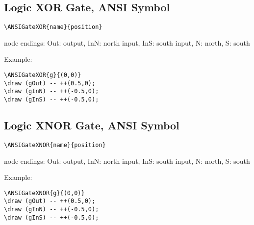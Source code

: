 \documentclass[parskip=full]{scrartcl}
\begin{document}
\subsection{Logic XOR Gate, ANSI Symbol}

\begin{verbatim}
\ANSIGateXOR{name}{position}
\end{verbatim}
node endings: Out: output,
              InN: north input, InS: south input,
              N: north, S: south

Example:\\
\begin{minipage}{0.8\textwidth}
\begin{verbatim}
\ANSIGateXOR{g}{(0,0)}
\draw (gOut) -- ++(0.5,0);
\draw (gInN) -- ++(-0.5,0);
\draw (gInS) -- ++(-0.5,0);
\end{verbatim}
\end{minipage}
\begin{minipage}{0.19\textwidth}
\end{minipage}

\subsection{Logic XNOR Gate, ANSI Symbol}

\begin{verbatim}
\ANSIGateXNOR{name}{position}
\end{verbatim}
node endings: Out: output,
              InN: north input, InS: south input,
              N: north, S: south

Example:\\
\begin{minipage}{0.8\textwidth}
\begin{verbatim}
\ANSIGateXNOR{g}{(0,0)}
\draw (gOut) -- ++(0.5,0);
\draw (gInN) -- ++(-0.5,0);
\draw (gInS) -- ++(-0.5,0);
\end{verbatim}
\end{minipage}
\begin{minipage}{0.19\textwidth}
\end{minipage}
\end{document}
